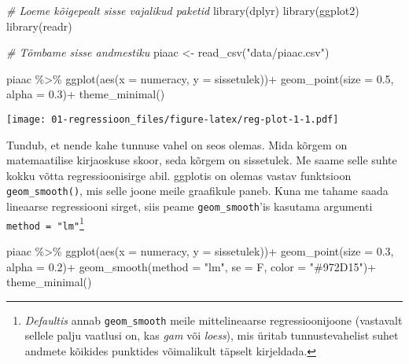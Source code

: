 \documentclass[
]{book}
\newenvironment{Shaded}{\begin{snugshade}}{\end{snugshade}}
\newcommand{\AttributeTok}[1]{\textcolor[rgb]{0.77,0.63,0.00}{#1}}
\newcommand{\CommentTok}[1]{\textcolor[rgb]{0.56,0.35,0.01}{\textit{#1}}}
\newcommand{\FloatTok}[1]{\textcolor[rgb]{0.00,0.00,0.81}{#1}}
\newcommand{\FunctionTok}[1]{\textcolor[rgb]{0.00,0.00,0.00}{#1}}
\newcommand{\NormalTok}[1]{#1}
\newcommand{\OtherTok}[1]{\textcolor[rgb]{0.56,0.35,0.01}{#1}}
\newcommand{\SpecialCharTok}[1]{\textcolor[rgb]{0.00,0.00,0.00}{#1}}
\newcommand{\StringTok}[1]{\textcolor[rgb]{0.31,0.60,0.02}{#1}}
\begin{document}
\begin{Shaded}
\begin{Highlighting}[]
\CommentTok{\# Loeme kõigepealt sisse vajalikud paketid}
\FunctionTok{library}\NormalTok{(dplyr)}
\FunctionTok{library}\NormalTok{(ggplot2)}
\FunctionTok{library}\NormalTok{(readr)}

\CommentTok{\# Tõmbame  sisse andmestiku}
\NormalTok{piaac }\OtherTok{\textless{}{-}} \FunctionTok{read\_csv}\NormalTok{(}\StringTok{"data/piaac.csv"}\NormalTok{)}

\NormalTok{piaac }\SpecialCharTok{\%\textgreater{}\%} 
  \FunctionTok{ggplot}\NormalTok{(}\FunctionTok{aes}\NormalTok{(}\AttributeTok{x =}\NormalTok{ numeracy, }\AttributeTok{y =}\NormalTok{ sissetulek))}\SpecialCharTok{+}
  \FunctionTok{geom\_point}\NormalTok{(}\AttributeTok{size =} \FloatTok{0.5}\NormalTok{, }\AttributeTok{alpha =} \FloatTok{0.3}\NormalTok{)}\SpecialCharTok{+}
  \FunctionTok{theme\_minimal}\NormalTok{()}
\end{Highlighting}
\end{Shaded}

\texttt{[image: 01-regressioon\_files/figure-latex/reg-plot-1-1.pdf]}

Tundub, et nende kahe tunnuse vahel on seos olemas. Mida kõrgem on matemaatilise kirjaoskuse skoor, seda kõrgem on sissetulek. Me saame selle suhte kokku võtta regressioonisirge abil. ggplotis on olemas vastav funktsioon \texttt{geom\_smooth()}, mis selle joone meile graafikule paneb. Kuna me tahame saada lineaarse regressiooni sirget, siis peame \texttt{geom\_smooth}'is kasutama argumenti \texttt{method\ =\ "lm"}\footnote{\emph{Defaultis} annab \texttt{geom\_smooth} meile mittelineaarse regressioonijoone (vastavalt sellele palju vaatlusi on, kas \emph{gam} või \emph{loess}), mis üritab tunnustevahelist suhet andmete kõikides punktides võimalikult täpselt kirjeldada.}

\begin{Shaded}
\begin{Highlighting}[]
\NormalTok{piaac }\SpecialCharTok{\%\textgreater{}\%} 
  \FunctionTok{ggplot}\NormalTok{(}\FunctionTok{aes}\NormalTok{(}\AttributeTok{x =}\NormalTok{ numeracy, }\AttributeTok{y =}\NormalTok{ sissetulek))}\SpecialCharTok{+}
  \FunctionTok{geom\_point}\NormalTok{(}\AttributeTok{size =} \FloatTok{0.3}\NormalTok{, }\AttributeTok{alpha =} \FloatTok{0.2}\NormalTok{)}\SpecialCharTok{+}
  \FunctionTok{geom\_smooth}\NormalTok{(}\AttributeTok{method =} \StringTok{"lm"}\NormalTok{, }\AttributeTok{se =}\NormalTok{ F, }\AttributeTok{color =} \StringTok{"\#972D15"}\NormalTok{)}\SpecialCharTok{+}
  \FunctionTok{theme\_minimal}\NormalTok{()}
\end{Highlighting}
\end{Shaded}
\end{document}
